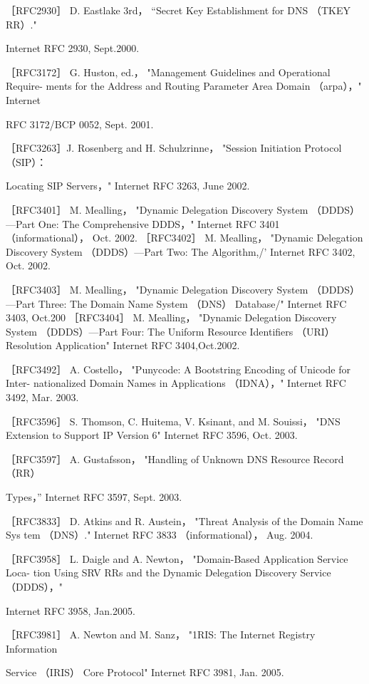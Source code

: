 ［RFC2930］ D. Eastlake 3rd， “Secret Key Establishment for DNS （TKEY RR）."

Internet RFC 2930, Sept.2000.

［RFC3172］ G. Huston, ed.， "Management Guidelines and Operational Require-
ments for the Address and Routing Parameter Area Domain （arpa），" Internet

RFC 3172/BCP 0052, Sept. 2001.

［RFC3263］J. Rosenberg and H. Schulzrinne， "Session Initiation Protocol （SIP）：

Locating SIP Servers，" Internet RFC 3263, June 2002.

［RFC3401］ M. Mealling， "Dynamic Delegation Discovery System （DDDS）—Part
One: The Comprehensive DDDS，" Internet RFC 3401 （informational）， Oct. 2002.
［RFC3402］ M. Mealling， "Dynamic Delegation Discovery System （DDDS）—Part
Two: The Algorithm,/' Internet RFC 3402, Oct. 2002.

［RFC3403］ M. Mealling， "Dynamic Delegation Discovery System （DDDS）—Part
Three: The Domain Name System （DNS） Database/" Internet RFC 3403, Oct.200
［RFC3404］ M. Mealling， "Dynamic Delegation Discovery System （DDDS）—Part
Four: The Uniform Resource Identifiers （URI） Resolution Application" Internet
RFC 3404,Oct.2002.

［RFC3492］ A. Costello， "Punycode: A Bootstring Encoding of Unicode for Inter-
nationalized Domain Names in Applications （IDNA），" Internet RFC 3492, Mar.
2003.

［RFC3596］ S. Thomson, C. Huitema, V. Ksinant, and M. Souissi， "DNS Extension
to Support IP Version 6" Internet RFC 3596, Oct. 2003.

［RFC3597］ A. Gustafsson， "Handling of Unknown DNS Resource Record （RR）

Types，” Internet RFC 3597, Sept. 2003.

［RFC3833］ D. Atkins and R. Austein， "Threat Analysis of the Domain Name Sys
tem （DNS）." Internet RFC 3833 （informational）， Aug. 2004.

［RFC3958］ L. Daigle and A. Newton， "Domain-Based Application Service Loca-
tion Using SRV RRs and the Dynamic Delegation Discovery Service （DDDS），"

Internet RFC 3958, Jan.2005.

［RFC3981］ A. Newton and M. Sanz， "1RIS: The Internet Registry Information

Service （IRIS） Core Protocol" Internet RFC 3981, Jan. 2005.

